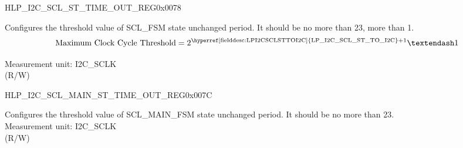     
    \begin{register}{H}{LP\_I2C\_SCL\_ST\_TIME\_OUT\_REG}{0x0078}\label{regdesc:LPI2CSCLSTTIMEOUTREG}
    \regnewline%
    \begin{regdesc}\begin{reglist}
    \label{fielddesc:LPI2CSCLSTTOI2C}\item [LP\_I2C\_SCL\_ST\_TO\_I2C] Configures the threshold value of SCL\_FSM state unchanged period. It should be no more than 23, more than 1.\\
\[
\text{Maximum Clock Cycle Threshold} = 2^{\text{\hyperref[fielddesc:LPI2CSCLSTTOI2C]{LP\_I2C\_SCL\_ST\_TO\_I2C}} + 1}–1
\]

Measurement unit: I2C\_SCLK \\ (R/W)
    \end{reglist}\end{regdesc}
    \end{register}
    
    
    \begin{register}{H}{LP\_I2C\_SCL\_MAIN\_ST\_TIME\_OUT\_REG}{0x007C}\label{regdesc:LPI2CSCLMAINSTTIMEOUTREG}
    \regnewline%
    \begin{regdesc}\begin{reglist}
    \label{fielddesc:LPI2CSCLMAINSTTOI2C}\item [LP\_I2C\_SCL\_MAIN\_ST\_TO\_I2C] Configures the threshold value of SCL\_MAIN\_FSM state unchanged period. It should be no more than 23.\\
Measurement unit: I2C\_SCLK \\ (R/W)
    \end{reglist}\end{regdesc}
    \end{register}
    
